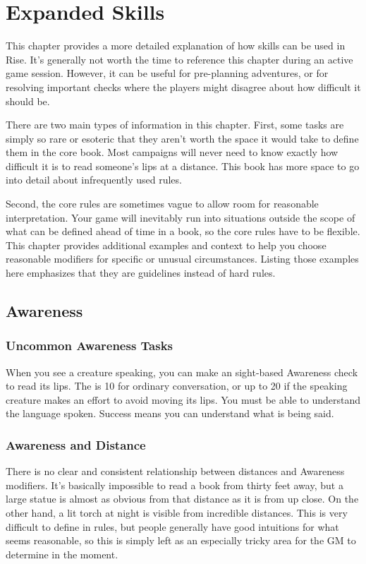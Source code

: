 \chapter{Expanded Skills}

This chapter provides a more detailed explanation of how skills can be used in Rise.
It's generally not worth the time to reference this chapter during an active game session.
However, it can be useful for pre-planning adventures, or for resolving important checks where the players might disagree about how difficult it should be.

There are two main types of information in this chapter.
First, some tasks are simply so rare or esoteric that they aren't worth the space it would take to define them in the core book.
Most campaigns will never need to know exactly how difficult it is to read someone's lips at a distance.
This book has more space to go into detail about infrequently used rules.

Second, the core rules are sometimes vague to allow room for reasonable interpretation.
Your game will inevitably run into situations outside the scope of what can be defined ahead of time in a book, so the core rules have to be flexible.
This chapter provides additional examples and context to help you choose reasonable modifiers for specific or unusual circumstances.
Listing those examples here emphasizes that they are guidelines instead of hard rules.

\section{Awareness}

    \subsection{Uncommon Awareness Tasks}
         When you see a creature speaking, you can make an sight-based Awareness check to read its lips.
        The  is 10 for ordinary conversation, or up to 20 if the speaking creature makes an effort to avoid moving its lips.
        You must be able to understand the language spoken.
        Success means you can understand what is being said.

    \subsection{Awareness and Distance}
        There is no clear and consistent relationship between distances and Awareness modifiers.
        It's basically impossible to read a book from thirty feet away, but a large statue is almost as obvious from that distance as it is from up close.
        On the other hand, a lit torch at night is visible from incredible distances.
        This is very difficult to define in rules, but people generally have good intuitions for what seems reasonable, so this is simply left as an especially tricky area for the GM to determine in the moment.
        
